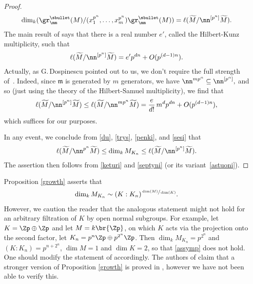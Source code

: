 \begin{proof}
\begin{equation}\label{sesi}
\dim_k (\gr^{\sbullet}_{\mm}(M)/(x_1^{p^n}, \ldots, x_m^{p^n})\gr^{\sbullet}_{\mm}(M) )= \ell(\widetilde{M}/\nn^{[p^n]} \widetilde{M}).
\end{equation}
The main result of \cite{monsky} says that there is a real number $e'$, called the Hilbert-Kunz multiplicity, such that
\begin{equation}\label{septyni}
\ell(\widetilde{M}/\nn^{[p^n]} \widetilde{M})= e' p^{dn} + O(p^{(d-1)n}).
\end{equation}
Actually, as G.\,Dospinescu pointed out to us, we don't require the full strength
of~\cite{monsky}. Indeed, since $\mathfrak m$ is generated by $m$ generators,
we have $\mathfrak \nn^{m p^n} \subseteq \nn^{[p^n]},$
and so (just using the theory of the Hilbert-Samuel multiplicity),
we find that
\begin{equation}
\label{astuoni}
\ell(\widetilde{M}/\nn^{[p^n]} \widetilde{M})
\leq \ell(\widetilde{M}/\nn^{m p^n} \widetilde{M}) = \dfrac{e}{d!}\,m^d p^{dn}
+ O(p^{(d-1)n}),
\end{equation}
which suffices for our purposes.

In any event,
we conclude from \eqref{du}, \eqref{trys}, \eqref{penki}, and \eqref{sesi}
that
\[
\ell(\widetilde{M}/\nn^{p^n} \widetilde{M})\le \dim_k M_{K_n} \le
\ell(\widetilde{M}/\nn^{[p^n]} \widetilde{M}).
\]
The assertion then follows from
\eqref{keturi} and \eqref{septyni} (or its variant~\eqref{astuoni}). \end{proof}

\begin{remark}Proposition \ref{growth} asserts that \begin{equation}
\label{assymp} \dim_k M_{K_n}\sim (K: K_n)^{\sfrac{\dim(M)} {\dim (K)}}.
\end{equation} However, we caution the reader that the analogous statement
might not hold for an arbitrary filtration of $K$ by open normal subgroups. For
example, let $K=\Zp \oplus \Zp$ and let $M=k\br{\Zp}$, on which $K$ acts via
the projection onto the second factor, let $K_n= p^n \Zp \oplus p^{2^n} \Zp$.
Then $\dim_k M_{K_n}= p^{2^n}$ and $(K:K_n)= p^{n+2^n}$, $\dim M=1$ and $\dim
K=2$, so that \eqref{assymp} does not hold. One should modify the statement of \hbox{\cite[Th.\,1.18]{calegari-emerton}} accordingly. The authors of
\cite{calegari-emerton} claim that a stronger version of Proposition \ref{growth} is proved in
\cite[\S 5]{ardakov_brown}, however we have not been able to verify this.
\end{remark}

